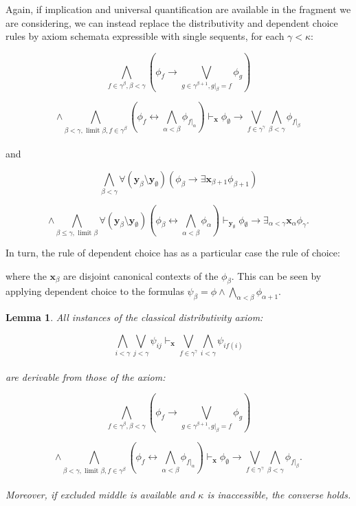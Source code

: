 \documentclass[a4paper,11pt]{article}
\theoremstyle{plain}
\newtheorem{lemma}[thm]{Lemma}
\theoremstyle{plain}
\theoremstyle{remark}
\begin{document}
Again, if implication and universal quantification are available in the fragment we are considering, we can instead replace the distributivity and dependent choice rules by axiom schemata expressible with single sequents, for each $\gamma < \kappa$:

$$\bigwedge_{f \in \gamma^{\beta}, \beta<\gamma} \left( \phi_{f} \to \bigvee_{g \in \gamma^{\beta+1}, g|_{\beta}=f} \phi_{g}\right)$$

$$\wedge \bigwedge_{\beta < \gamma, \text{ limit }\beta, f \in \gamma^{\beta}} \left(\phi_{f} \leftrightarrow \bigwedge_{\alpha<\beta}\phi_{f|_{\alpha}}\right) \vdash_{\mathbf{x}} \phi_{\emptyset} \to \bigvee_{f \in \gamma^{\gamma}} \bigwedge_{\beta<\gamma}\phi_{f|_{\beta}}$$
\\
and

$$\bigwedge_{\beta < \gamma} \forall (\mathbf{y}_{\beta} \setminus \mathbf{y}_{\emptyset}) \left(\phi_{\beta} \to \exists \mathbf{x}_{\beta +1} \phi_{\beta +1} \right)$$

$$\wedge \bigwedge_{\beta \leq \gamma, \text{ limit }\beta} \forall (\mathbf{y}_{\beta} \setminus \mathbf{y}_{\emptyset}) \left(\phi_{\beta} \leftrightarrow \bigwedge_{\alpha<\beta}\phi_{\alpha} \right) \vdash_{\mathbf{y}_{\emptyset}} \phi_{\emptyset} \to \exists_{\alpha < \gamma} \mathbf{x}_{\alpha} \phi_{\gamma}.$$

In turn, the rule of dependent choice has as a particular case the rule of choice:

\begin{mathpar}
\end{mathpar}

\noindent where the $\mathbf{x}_{\beta}$ are disjoint canonical contexts of the $\phi_{\beta}$. This can be seen by applying dependent choice to the formulas $\psi_{\beta}=\phi \wedge \bigwedge_{\alpha<\beta}\phi_{\alpha+1}$.

\begin{lemma}\label{equivl}
All instances of the classical distributivity axiom:

$$\bigwedge_{i<\gamma}\bigvee_{j<\gamma} \psi_{ij} \vdash_{\mathbf{x}} \bigvee_{f \in \gamma^{\gamma}}\bigwedge_{i<\gamma} \psi_{if(i)}$$
\\
are derivable from those of the axiom: 

$$\bigwedge_{f \in \gamma^{\beta}, \beta<\gamma}\left(\phi_{f} \to \bigvee_{g \in \gamma^{\beta+1}, g|_{\beta}=f} \phi_{g}\right)$$

$$\wedge \bigwedge_{\beta < \gamma, \text{ limit }\beta, f \in \gamma^{\beta}} \left(\phi_{f} \leftrightarrow \bigwedge_{\alpha<\beta}\phi_{f|_{\alpha}}\right) \vdash_{\mathbf{x}} \phi_{\emptyset} \to \bigvee_{f \in \gamma^{\gamma}} \bigwedge_{\beta<\gamma}\phi_{f|_{\beta}}.$$
\\
Moreover, if excluded middle is available and $\kappa$ is inaccessible, the converse holds.

\end{lemma}
\end{document}
